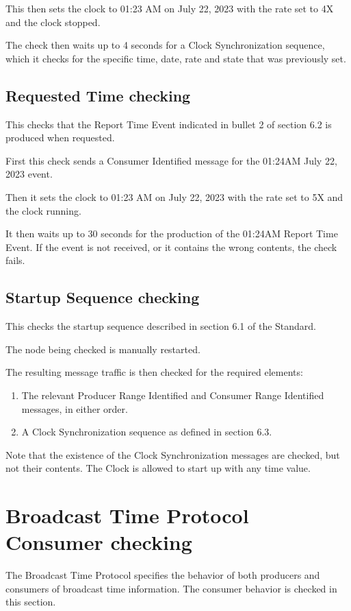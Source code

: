 This then sets the clock to 01:23 AM on July 22, 2023 with the rate set to 4X and the clock stopped.

The check then waits up to 4 seconds for a Clock Synchronization sequence, which it checks for
the specific time, date, rate and state that was previously set.

\subsection{Requested Time checking}

This checks that the Report Time Event indicated in bullet 2 of section 6.2 is 
produced when requested.

First this check sends a Consumer Identified message for the 01:24AM  July 22, 2023 event.

Then it sets the clock to 01:23 AM on July 22, 2023 with the rate set to 5X and the clock running.

It then waits up to 30 seconds for the production of the 01:24AM Report Time Event.
If the event is not received, or it contains the wrong contents, the check fails.

\subsection{Startup Sequence checking}

This checks the startup sequence described in section 6.1 of the Standard.

The node being checked is manually restarted.

The resulting message traffic is then checked for the required elements:
\begin{enumerate}
\item The relevant Producer Range Identified and Consumer Range Identified messages, in either order.
\item A Clock Synchronization sequence as defined in section 6.3.
\end{enumerate}

Note that the existence of the Clock Synchronization messages are checked, but not 
their contents.  The Clock is allowed to start up with any time value.

\section{Broadcast Time Protocol Consumer checking}

The Broadcast Time Protocol specifies the behavior of both producers and consumers of 
broadcast time information.  
The consumer behavior is checked in this section.

